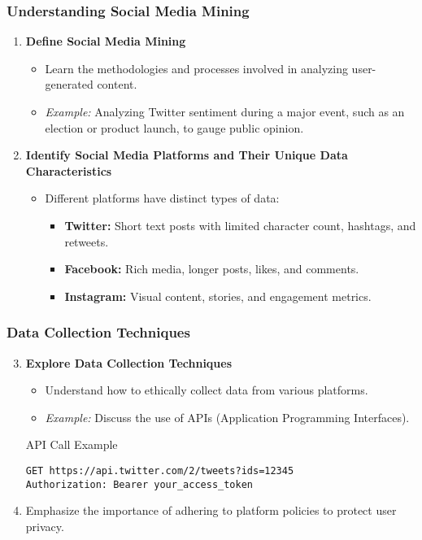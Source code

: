\documentclass{beamer}
\begin{document}
\begin{frame}[fragile]
    \frametitle{Understanding Social Media Mining}
    \begin{enumerate}
        \item \textbf{Define Social Media Mining}
        \begin{itemize}
            \item Learn the methodologies and processes involved in analyzing user-generated content.
            \item \textit{Example:} Analyzing Twitter sentiment during a major event, such as an election or product launch, to gauge public opinion.
        \end{itemize}

        \item \textbf{Identify Social Media Platforms and Their Unique Data Characteristics}
        \begin{itemize}
            \item Different platforms have distinct types of data:
            \begin{itemize}
                \item \textbf{Twitter:} Short text posts with limited character count, hashtags, and retweets.
                \item \textbf{Facebook:} Rich media, longer posts, likes, and comments.
                \item \textbf{Instagram:} Visual content, stories, and engagement metrics.
            \end{itemize}
        \end{itemize}
    \end{enumerate}
\end{frame}

\begin{frame}[fragile]
    \frametitle{Data Collection Techniques}
    \begin{enumerate}
        \setcounter{enumi}{2} %
        \item \textbf{Explore Data Collection Techniques}
        \begin{itemize}
            \item Understand how to ethically collect data from various platforms.
            \item \textit{Example:} Discuss the use of APIs (Application Programming Interfaces).
        \end{itemize}
        \begin{block}{API Call Example}
            \begin{lstlisting}[language=HTTP]
GET https://api.twitter.com/2/tweets?ids=12345
Authorization: Bearer your_access_token
            \end{lstlisting}
        \end{block}
        \item Emphasize the importance of adhering to platform policies to protect user privacy.
    \end{enumerate}
\end{frame}
\end{document}
